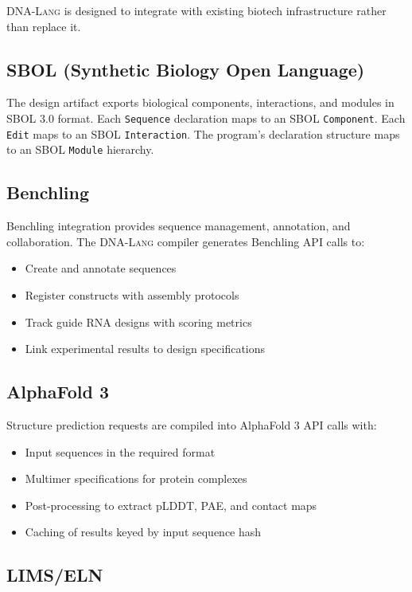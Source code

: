 \documentclass[12pt,a4paper]{article}
\newcommand{\DNALang}{\textsc{DNA-Lang}}
\newcommand{\ty}[1]{\texttt{#1}}
\begin{document}
\DNALang{} is designed to integrate with existing biotech infrastructure rather than replace it.

\subsection{SBOL (Synthetic Biology Open Language)}

The design artifact exports biological components, interactions, and modules in SBOL 3.0 format. Each \ty{Sequence} declaration maps to an SBOL \texttt{Component}. Each \ty{Edit} maps to an SBOL \texttt{Interaction}. The program's declaration structure maps to an SBOL \texttt{Module} hierarchy.

\subsection{Benchling}

Benchling integration provides sequence management, annotation, and collaboration. The \DNALang{} compiler generates Benchling API calls to:
\begin{itemize}
    \item Create and annotate sequences
    \item Register constructs with assembly protocols
    \item Track guide RNA designs with scoring metrics
    \item Link experimental results to design specifications
\end{itemize}

\subsection{AlphaFold 3}

Structure prediction requests are compiled into AlphaFold 3 API calls with:
\begin{itemize}
    \item Input sequences in the required format
    \item Multimer specifications for protein complexes
    \item Post-processing to extract pLDDT, PAE, and contact maps
    \item Caching of results keyed by input sequence hash
\end{itemize}

\subsection{LIMS/ELN}
\end{document}
